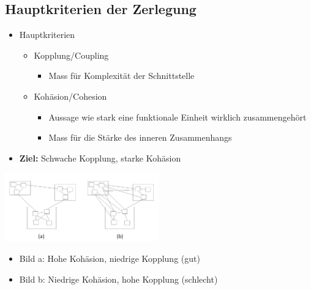 \subsection{Hauptkriterien der Zerlegung}
\begin{itemize}
  \item Hauptkriterien
  \begin{itemize}
    \item Kopplung/Coupling
    \begin{itemize}
      \item Mass für Komplexität der Schnittstelle
    \end{itemize}
    \item Kohäsion/Cohesion
    \begin{itemize}
      \item Aussage wie stark eine funktionale Einheit wirklich zusammengehört
      \item Mass für die Stärke des inneren Zusammenhangs 
    \end{itemize}
  \end{itemize}
  \item \textbf{Ziel:} Schwache Kopplung, starke Kohäsion 
\end{itemize}
\begin{center}
{\includegraphics[width=0.5\textwidth]{images/Modularisierung/BeispieleKopplungKohaesion.png}}
\end{center}
\begin{itemize}
  \item Bild a: Hohe Kohäsion, niedrige Kopplung (gut)
  \item Bild b: Niedrige Kohäsion, hohe Kopplung (schlecht)
\end{itemize}
